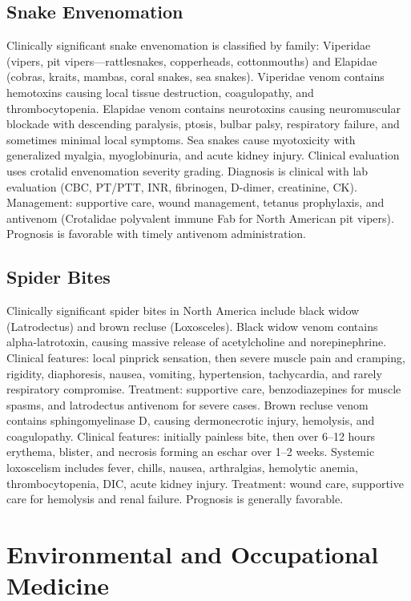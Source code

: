\subsection{Snake Envenomation}
\label{sec:Snake Envenomation}
Clinically significant snake envenomation is classified by family: Viperidae (vipers, pit vipers---rattlesnakes, copperheads, cottonmouths) and Elapidae (cobras, kraits, mambas, coral snakes, sea snakes). Viperidae venom contains hemotoxins causing local tissue destruction, coagulopathy, and thrombocytopenia. Elapidae venom contains neurotoxins causing neuromuscular blockade with descending paralysis, ptosis, bulbar palsy, respiratory failure, and sometimes minimal local symptoms. Sea snakes cause myotoxicity with generalized myalgia, myoglobinuria, and acute kidney injury. Clinical evaluation uses crotalid envenomation severity grading. Diagnosis is clinical with lab evaluation (CBC, PT/PTT, INR, fibrinogen, D-dimer, creatinine, CK). Management: supportive care, wound management, tetanus prophylaxis, and antivenom (Crotalidae polyvalent immune Fab for North American pit vipers). Prognosis is favorable with timely antivenom administration.

\subsection{Spider Bites}
\label{sec:Spider Bites}
Clinically significant spider bites in North America include black widow (Latrodectus) and brown recluse (Loxosceles). Black widow venom contains alpha-latrotoxin, causing massive release of acetylcholine and norepinephrine. Clinical features: local pinprick sensation, then severe muscle pain and cramping, rigidity, diaphoresis, nausea, vomiting, hypertension, tachycardia, and rarely respiratory compromise. Treatment: supportive care, benzodiazepines for muscle spasms, and latrodectus antivenom for severe cases. Brown recluse venom contains sphingomyelinase D, causing dermonecrotic injury, hemolysis, and coagulopathy. Clinical features: initially painless bite, then over 6--12 hours erythema, blister, and necrosis forming an eschar over 1--2 weeks. Systemic loxoscelism includes fever, chills, nausea, arthralgias, hemolytic anemia, thrombocytopenia, DIC, acute kidney injury. Treatment: wound care, supportive care for hemolysis and renal failure. Prognosis is generally favorable.

\section{Environmental and Occupational Medicine}

